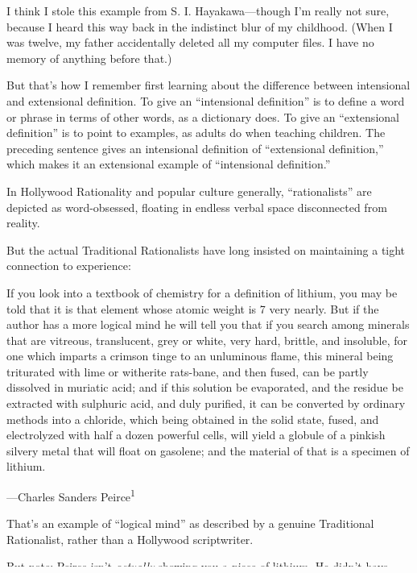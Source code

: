 {
 I think I stole this example from S. I. Hayakawa---though
I'm really not sure, because I heard this way back in
the indistinct blur of my childhood. (When I was twelve, my father
accidentally deleted all my computer files. I have no memory of
anything before that.)}

{
 But that's how I remember first learning about the
difference between intensional and extensional definition. To give an
``intensional definition'' is to
define a word or phrase in terms of other words, as a dictionary does.
To give an ``extensional
definition'' is to point to examples, as adults do
when teaching children. The preceding sentence gives an intensional
definition of ``extensional
definition,'' which makes it an extensional example
of ``intensional definition.''}

{
 In Hollywood Rationality and popular culture generally,
``rationalists'' are depicted as
word-obsessed, floating in endless verbal space disconnected from
reality.}

{
 But the actual Traditional Rationalists have long insisted on
maintaining a tight connection to experience:}

{
 If you look into a textbook of chemistry for a definition of
lithium, you may be told that it is that element whose atomic weight is
7 very nearly. But if the author has a more logical mind he will tell
you that if you search among minerals that are vitreous, translucent,
grey or white, very hard, brittle, and insoluble, for one which imparts
a crimson tinge to an unluminous flame, this mineral being triturated
with lime or witherite rats-bane, and then fused, can be partly
dissolved in muriatic acid; and if this solution be evaporated, and the
residue be extracted with sulphuric acid, and duly purified, it can be
converted by ordinary methods into a chloride, which being obtained in
the solid state, fused, and electrolyzed with half a dozen powerful
cells, will yield a globule of a pinkish silvery metal that will float
on gasolene; and the material of that is a specimen of lithium.}

{\raggedleft
 {}---Charles Sanders Peirce\textsuperscript{1}
\par}


\bigskip

{
 That's an example of ``logical
mind'' as described by a genuine Traditional
Rationalist, rather than a Hollywood scriptwriter.}

{
 But note: Peirce isn't \textit{actually} showing
you a piece of lithium. He didn't have pieces of
lithium stapled to his book. Rather he's giving you a
treasure map---an intensionally defined procedure which, when executed,
will lead you to an extensional example of lithium. This is not the
same as just tossing you a hunk of lithium, but it's
not the same as saying ``atomic weight
7'' either. (Though if you had \textit{sufficiently
sharp} eyes, saying ``3 protons''
might let you pick out lithium at a glance \ldots)}

